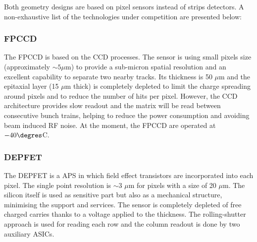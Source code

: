 
   Both geometry designs are based on  pixel sensors instead of strips detectors.
   A non-exhaustive list of the technologies under competition are presented below:
    
   \subsubsection{FPCCD}
   
     The \gls{FPCCD} \cite{CalanchaParedes} is based on the \gls{CCD} processes.
     The sensor is using small pixels size (approximately $\sim 5 \mu\text{m}$) to provide a sub-micron spatial resolution and an excellent capability to separate two nearby tracks.
     Its thickness is 50 $\mu\text{m}$ and the epitaxial layer (15 $\mu\text{m}$ thick) is completely depleted to limit the charge spreading around pixels and to reduce the number of hits per pixel.
     However, the \gls{CCD} architecture provides slow readout and the matrix will be read between consecutive bunch trains, helping to reduce the power consumption and avoiding beam induced RF noise.
     At the moment, the \gls{FPCCD} are operated at $-40 \degres$C.

   \subsubsection{DEPFET}
    
    The \gls{DEPFET} \cite{Richter2003} is a \gls{APS} in which field effect transistors are incorporated into each pixel.
    The single point resolution is $\sim 3$ $\mu\text{m}$ for pixels with a size of 20 $\mu\text{m}$.
    The silicon itself is used as sensitive part but also as a mechanical structure, minimising the support and services.
    The sensor is completely depleted of free charged carries thanks to a voltage applied to the thickness.
    The rolling-shutter approach is used for reading each row and the column readout is done by two auxiliary \glspl{ASIC}.


